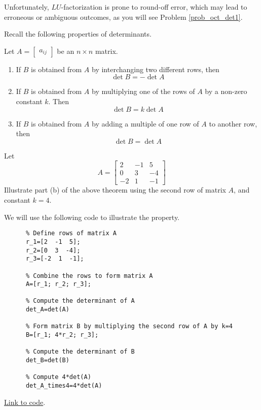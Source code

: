 \documentclass{ximera}
\begin{document}
Unfortunately, $LU$-factorization is prone to round-off error, which may lead to erroneous or ambiguous outcomes, as you will see Problem \ref{prob_oct_det1}.

Recall the following properties of determinants.

\begin{theorem}[\ref{th:elemrowopsanddet}]
  Let $A=\begin{bmatrix}a_{ij}\end{bmatrix}$ be an $n\times n$ matrix. 
  \begin{enumerate}
  \item
  If $B$ is obtained from $A$ by interchanging two different rows, then $$\det{B}=-\det{A}$$
  \item 
  If $B$ is obtained from $A$ by multiplying one of the rows of $A$ by a non-zero constant $k$.  Then $$\det{B}=k\det{A}$$
  \item 
  If $B$ is obtained from $A$ by adding a multiple of one row of $A$ to another row, then
  $$\det{B}=\det{A}$$
  \end{enumerate}
  \end{theorem}

\begin{example}\label{ex_det_prop}
  Let $$A=\begin{bmatrix}
  2 & -1 & 5\\0 & 3 & -4\\-2 & 1 & -1
  \end{bmatrix}$$
  Illustrate part (b) of the above theorem using the second row of matrix $A$, and constant $k=4$.
  \begin{explanation}
    We will use the following code to illustrate the property.
    \begin{verbatim}
      % Define rows of matrix A
      r_1=[2  -1  5];
      r_2=[0  3  -4];
      r_3=[-2  1  -1];

      % Combine the rows to form matrix A
      A=[r_1; r_2; r_3];

      % Compute the determinant of A
      det_A=det(A)

      % Form matrix B by multiplying the second row of A by k=4
      B=[r_1; 4*r_2; r_3];

      % Compute the determinant of B
      det_B=det(B)

      % Compute 4*det(A)
      det_A_times4=4*det(A)
    \end{verbatim}

    \href{https://sagecell.sagemath.org/?z=eJyVjrEKgzAURXfBf3iLUAWhajpJBtPSn5AiWmMbahKJkda_bxIV3EqXNxzuO5wALrRjgoKS7xFkB7zWin2g8D1VJbhMAeIE4HTLLUhxeQTIDEMLyHAZm0liV5b4XgBnyRtr1M_VqiV0UvGdusClsedgjPZku9dh0strSzVVnIlaaNtlvgypCmzuoQiX_XWnJdDMwKdes6GfmXg4yUjvUrQ2wzns5IWR75E1AEV_JJAlgbgEEv7co2hrdeWVZpyOCG_4C2FMb7M=&lang=octave&interacts=eJyLjgUAARUAuQ==}{Link to code}.
  \end{explanation}

\end{example}
\end{document}

